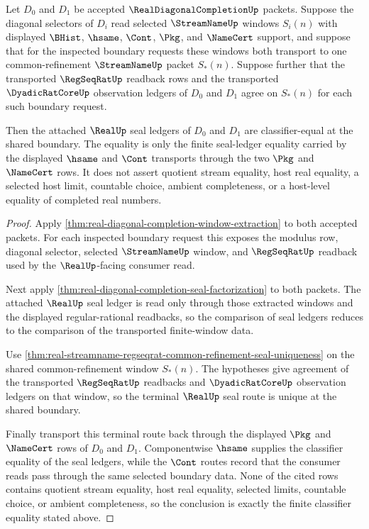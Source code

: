 \begin{theorem}
\label{thm:real-diagonal-completion-common-refinement-seal-invariance}
Let $D_0$ and $D_1$ be accepted $\RealDiagonalCompletionUp$ packets. Suppose the diagonal selectors of $D_i$ read selected $\StreamNameUp$ windows $S_i(n)$ with displayed $\BHist$, $\hsame$, $\Cont$, $\Pkg$, and $\NameCert$ support, and suppose that for the inspected boundary requests these windows both transport to one common-refinement $\StreamNameUp$ packet $S_\ast(n)$. Suppose further that the transported $\RegSeqRatUp$ readback rows and the transported $\DyadicRatCoreUp$ observation ledgers of $D_0$ and $D_1$ agree on $S_\ast(n)$ for each such boundary request.

Then the attached $\RealUp$ seal ledgers of $D_0$ and $D_1$ are classifier-equal at the shared boundary. The equality is only the finite seal-ledger equality carried by the displayed $\hsame$ and $\Cont$ transports through the two $\Pkg$ and $\NameCert$ rows. It does not assert quotient stream equality, host real equality, a selected host limit, countable choice, ambient completeness, or a host-level equality of completed real numbers.
\end{theorem}
\begin{proof}
Apply \autoref{thm:real-diagonal-completion-window-extraction} to both accepted packets. For each inspected boundary request this exposes the modulus row, diagonal selector, selected $\StreamNameUp$ window, and $\RegSeqRatUp$ readback used by the $\RealUp$-facing consumer read.

Next apply \autoref{thm:real-diagonal-completion-seal-factorization} to both packets. The attached $\RealUp$ seal ledger is read only through those extracted windows and the displayed regular-rational readbacks, so the comparison of seal ledgers reduces to the comparison of the transported finite-window data.

Use \autoref{thm:real-streamname-regseqrat-common-refinement-seal-uniqueness} on the shared common-refinement window $S_\ast(n)$. The hypotheses give agreement of the transported $\RegSeqRatUp$ readbacks and $\DyadicRatCoreUp$ observation ledgers on that window, so the terminal $\RealUp$ seal route is unique at the shared boundary.

Finally transport this terminal route back through the displayed $\Pkg$ and $\NameCert$ rows of $D_0$ and $D_1$. Componentwise $\hsame$ supplies the classifier equality of the seal ledgers, while the $\Cont$ routes record that the consumer reads pass through the same selected boundary data. None of the cited rows contains quotient stream equality, host real equality, selected limits, countable choice, or ambient completeness, so the conclusion is exactly the finite classifier equality stated above.
\end{proof}

